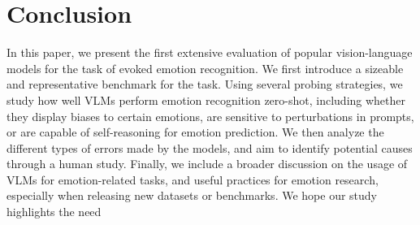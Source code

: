 \section{Conclusion}
\label{sec:conclusion}

In this paper, we present the first extensive evaluation of popular vision-language models for the task of evoked emotion recognition. We first introduce a sizeable and representative benchmark for the task. Using several probing strategies, we study how well VLMs perform emotion recognition zero-shot, including whether they display biases to certain emotions, are sensitive to perturbations in prompts, or are capable of self-reasoning for emotion prediction. We then analyze the different types of errors made by the models, and aim to identify potential causes through a human study. Finally, we include a broader discussion on the usage of VLMs for emotion-related tasks, and useful practices for emotion research, especially when releasing new datasets or benchmarks. We hope our study highlights the need 